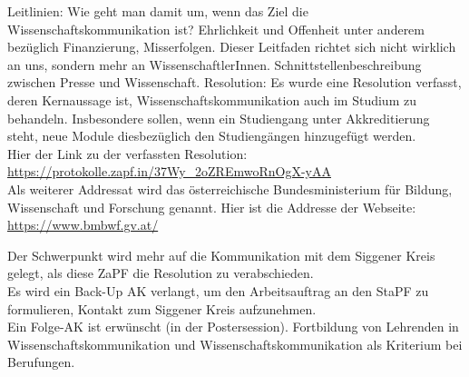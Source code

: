 \begin{outline}
        \1 Leitlinien: Wie geht man damit um, wenn das Ziel die Wissenschaftskommunikation ist?
          \2 Ehrlichkeit und Offenheit unter anderem bezüglich Finanzierung, Misserfolgen.
          \2 Dieser Leitfaden richtet sich nicht wirklich an uns, sondern mehr an WissenschaftlerInnen.
          \2 Schnittstellenbeschreibung zwischen Presse und Wissenschaft.
        \1 Resolution:
        Es wurde eine Resolution verfasst, deren Kernaussage ist, Wissenschaftskommunikation auch im Studium zu behandeln. Insbesondere sollen, wenn ein Studiengang unter Akkreditierung steht, neue Module diesbezüglich den Studiengängen hinzugefügt werden. \\
        Hier der Link zu der verfassten Resolution: \url{https://protokolle.zapf.in/37Wy_2oZREmwoRnOgX-yAA} \\
        Als weiterer Addressat wird das österreichische Bundesministerium für Bildung, Wissenschaft und Forschung genannt. Hier ist die Addresse der Webseite: \url{https://www.bmbwf.gv.at/}
      \end{outline}

    Der Schwerpunkt wird mehr auf die Kommunikation mit dem Siggener Kreis gelegt, als diese ZaPF die Resolution zu verabschieden. \\

    Es wird ein Back-Up AK verlangt, um den Arbeitsauftrag an den StaPF zu formulieren, Kontakt zum Siggener Kreis aufzunehmen. \\

    Ein Folge-AK ist erwünscht (in der Postersession). Fortbildung von Lehrenden in Wissenschaftskommunikation und Wissenschaftskommunikation als Kriterium bei Berufungen.
